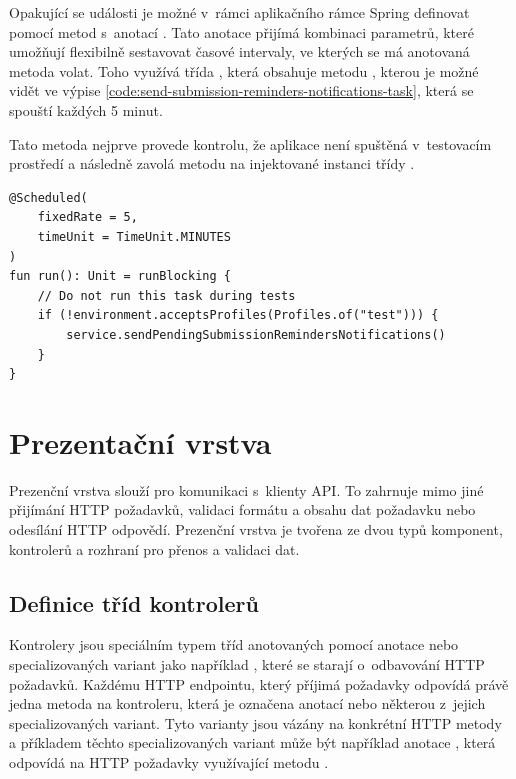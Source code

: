Opakující se události je možné v~rámci aplikačního rámce Spring definovat pomocí metod s~anotací . Tato anotace přijímá kombinaci parametrů, které umožňují flexibilně sestavovat časové intervaly, ve kterých se má anotovaná metoda volat. Toho využívá třída , která obsahuje metodu , kterou je možné vidět ve výpise \ref{code:send-submission-reminders-notifications-task}, která se spouští každých 5 minut. 

Tato metoda nejprve provede kontrolu, že aplikace není spuštěná v~testovacím prostředí a následně zavolá metodu  na injektované instanci třídy .

\begin{lstlisting}[label={code:send-submission-reminders-notifications-task}, caption={Definice periodicky spouštěné metody run}]
@Scheduled(
    fixedRate = 5,
    timeUnit = TimeUnit.MINUTES
)
fun run(): Unit = runBlocking {
    // Do not run this task during tests
    if (!environment.acceptsProfiles(Profiles.of("test"))) {
        service.sendPendingSubmissionRemindersNotifications()
    }
}
\end{lstlisting}

\section{Prezentační vrstva}

Prezenční vrstva slouží pro komunikaci s~klienty API. To zahrnuje mimo jiné přijímání HTTP požadavků, validaci formátu a obsahu dat požadavku nebo odesílání HTTP odpovědí. Prezenční vrstva je tvořena ze dvou typů komponent, kontrolerů a rozhraní pro přenos a validaci dat.

\subsection{Definice tříd kontrolerů}

Kontrolery jsou speciálním typem tříd anotovaných pomocí anotace  nebo specializovaných variant jako například , které se starají o~odbavování HTTP požadavků. Každému HTTP endpointu, který příjimá požadavky odpovídá právě jedna metoda na kontroleru, která je označena anotací  nebo některou z~jejich specializovaných variant. Tyto varianty jsou vázány na konkrétní HTTP metody a příkladem těchto specializovaných variant může být například anotace , která odpovídá na HTTP požadavky využívající metodu  \cite[kap. 1.3.1]{walls_spring_2019}.

